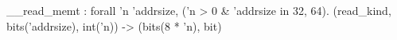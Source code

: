__read_memt : forall 'n 'addrsize, ('n > 0 & 'addrsize in {32, 64}).
  (read_kind, bits('addrsize), int('n)) -> (bits(8 * 'n), bit)
